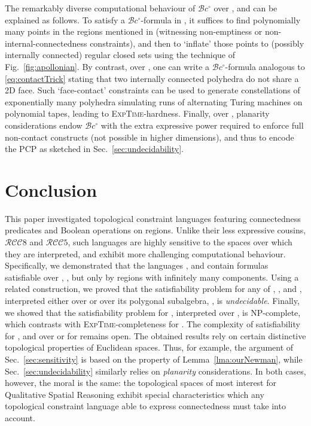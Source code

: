 \documentclass{article}
\newcommand{\NP}{\textsc{NP}}
\newcommand{\ExpTime}{\textsc{ExpTime}}
\newcommand{\cBci}{\ensuremath{\mathcal{B}c^\circ}}
\newcommand{\RCCE}{\ensuremath{\mathcal{RCC}8}}\newcommand{\RCCF}{\ensuremath{\mathcal{RCC}5}}\newcommand{\BRCCE}{\ensuremath{\mathcal{BRCC}8}}\newcommand{\RCCEc}{\ensuremath{\RCCE{}c}}\newcommand{\RCCEci}{\ensuremath{\RCCE{}c^\circ}}\newcommand{\cBCc}{\ensuremath{\mathcal{C}c}}\newcommand{\cBCci}{\ensuremath{\mathcal{C}c^\circ}}
\begin{document}
The remarkably diverse computational behaviour of \cBci{} over
,  and  can be explained as
follows. To satisfy a \cBci-formula  in , it suffices
to find polynomially many points in the regions mentioned in 
(witnessing non-emptiness or non-internal-connectedness constraints),
and then to `inflate' those points to (possibly internally connected)
regular closed sets using the technique of Fig.~\ref{fig:apollonian}.
By contrast, over , one can write a \cBci-formula
analogous to \eqref{eq:contactTrick} stating that two internally
connected polyhedra do not share a 2D face.  Such
`face-contact' constraints can be used to generate constellations of
exponentially many polyhedra simulating runs of alternating Turing
machines on polynomial tapes, leading to \ExpTime-hardness. Finally,
over , planarity considerations endow \cBci{} with the
extra expressive power required to enforce full non-contact constructs
(not possible in higher dimensions), and thus to encode the PCP as
sketched in Sec.~\ref{sec:undecidability}.







\section{Conclusion}\label{conclusion}

This paper investigated topological constraint
languages featuring connectedness predicates and Boolean operations on
regions.  Unlike their less expressive cousins, \RCCE{} and \RCCF,
such languages are highly sensitive to the spaces over which they
are interpreted, and exhibit more challenging computational
behaviour. Specifically, we demonstrated that the languages ,
 and  contain formulas satisfiable over , , but only by regions with infinitely many components. Using a
related construction, we proved that the satisfiability problem for
any of , ,  and , interpreted either over
 or over its polygonal subalgebra, , is
\emph{undecidable}. Finally, we showed that the satisfiability problem
for , interpreted over , is \NP-complete, which
contrasts with \ExpTime-completeness for .  The complexity
of satisfiability for ,  and  over  or
 for  remains open. 
The obtained results rely on certain
distinctive topological properties of Euclidean spaces. 
Thus, for example, the argument of
Sec.~\ref{sec:sensitivity} is based on the property of
Lemma~\ref{lma:ourNewman}, while Sec.~\ref{sec:undecidability}
similarly relies on {\em planarity} considerations. In both cases,
however, the moral is the same: the topological spaces of most
interest for Qualitative Spatial Reasoning exhibit special
characteristics which any topological constraint language able to
express connectedness must take into account.
\end{document}
